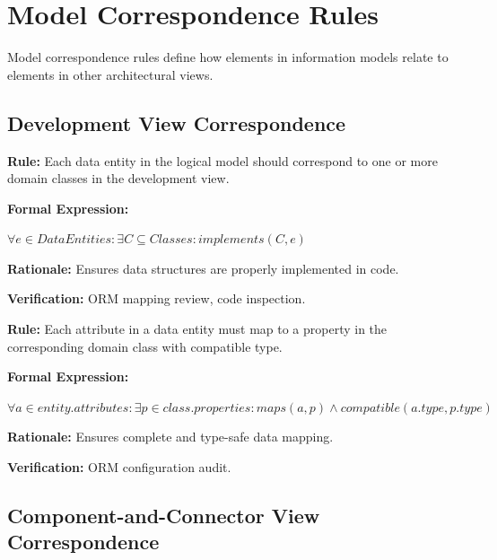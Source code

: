 \documentclass[11pt,letterpaper]{article}
\begin{document}
\section{Model Correspondence Rules}

Model correspondence rules define how elements in information models relate to elements in other architectural views.

\subsection{Development View Correspondence}

\begin{definitionbox}
\textbf{Rule:} Each data entity in the logical model should correspond to one or more domain classes in the development view.

\textbf{Formal Expression:}
\begin{center}
$\forall e \in DataEntities : \exists C \subseteq Classes : implements(C, e)$
\end{center}

\textbf{Rationale:} Ensures data structures are properly implemented in code.

\textbf{Verification:} ORM mapping review, code inspection.
\end{definitionbox}

\begin{definitionbox}
\textbf{Rule:} Each attribute in a data entity must map to a property in the corresponding domain class with compatible type.

\textbf{Formal Expression:}
\begin{center}
$\forall a \in entity.attributes : \exists p \in class.properties : maps(a, p) \land compatible(a.type, p.type)$
\end{center}

\textbf{Rationale:} Ensures complete and type-safe data mapping.

\textbf{Verification:} ORM configuration audit.
\end{definitionbox}

\subsection{Component-and-Connector View Correspondence}
\end{document}
